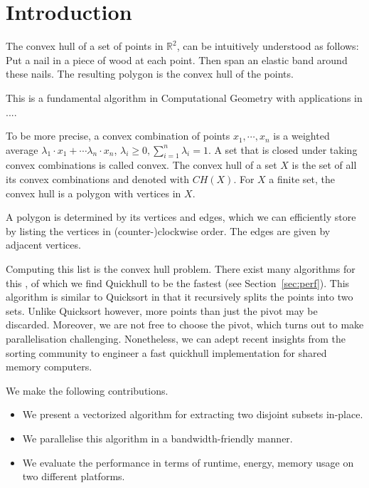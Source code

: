 \section{Introduction}

The convex hull of a set of points in $\mathbb{R}^2$, can be intuitively 
understood as follows: Put a nail in a piece of wood at each point. Then span 
an elastic band around these nails. The resulting polygon is the convex hull of 
the points.

This is a fundamental algorithm in Computational Geometry with applications
in .... 

To be more precise, a convex combination of points $x_1, \cdots, x_n$ is a 
weighted average $\lambda_1 \cdot x_1 + \cdots \lambda_n \cdot x_n$, 
$\lambda_i \geq 0, \sum_{i = 1}^n \lambda_i = 1$. A set that is closed under
taking convex combinations is called convex. The convex hull of a set $X$ is
the set of all its convex combinations and denoted with $CH(X)$. For $X$
a finite set, the convex hull is a polygon with vertices in $X$.

A polygon is determined by its vertices and edges, which we can efficiently
store by listing the vertices in (counter-)clockwise order. The edges are given 
by adjacent vertices.

Computing this list is the convex hull problem. There exist many algorithms for 
this \cite{}, of which we find Quickhull to be the fastest (see
Section~\ref{sec:perf}). This algorithm is similar to Quicksort in that
it recursively splits the points into two sets. Unlike Quicksort however,
more points than just the pivot may be discarded. Moreover, we are not
free to choose the pivot, which turns out to make parallelisation challenging.
Nonetheless, we can adept recent insights from the sorting community to engineer
a fast quickhull implementation for shared memory computers.

We make the following contributions.

\begin{itemize}
    \item We present a vectorized algorithm for extracting two disjoint 
          subsets in-place.
    \item We parallelise this algorithm in a bandwidth-friendly manner.
    \item We evaluate the performance in terms of runtime, energy, memory usage
          on two different platforms. 
\end{itemize}

